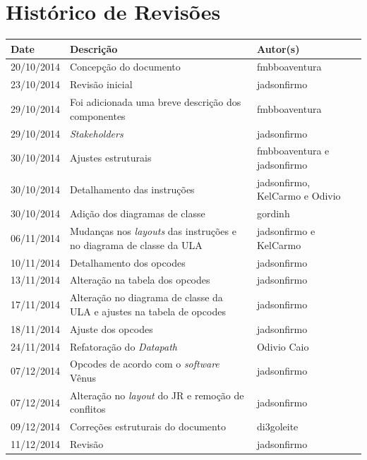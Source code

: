 \documentclass{report}
\begin{document}

\capa
\newpage
\newpage

\chapter*{Histórico de Revisões}
  \vspace*{1cm}
  \begin{table}[ht]
    \centering
    \begin{tabular}[pos]{|m{2cm} | m{8cm} | m{4cm}|} 
      \hline
      \cellcolor[gray]{0.9}
      \textbf{Date} & \cellcolor[gray]{0.9}\textbf{Descrição} & \cellcolor[gray]{0.9}\textbf{Autor(s)}\\
      \hline 20/10/2014 & Concepção do documento & fmbboaventura \\ \hline
      		 23/10/2014 & Revisão inicial & jadsonfirmo \\ \hline
      		 29/10/2014 & Foi adicionada uma breve descrição dos componentes & fmbboaventura \\ \hline       
      		 29/10/2014 & \textit{Stakeholders} & jadsonfirmo \\ \hline
      		 30/10/2014 & Ajustes estruturais & fmbboaventura e jadsonfirmo \\ \hline
      		 30/10/2014 & Detalhamento das instruções & jadsonfirmo, KelCarmo e Odivio \\ \hline
      		 30/10/2014 & Adição dos diagramas de classe & gordinh \\ \hline
      		 06/11/2014 & Mudanças nos \textit{layouts} das instruções e no diagrama de classe da ULA & jadsonfirmo e KelCarmo \\ \hline
      		 10/11/2014 & Detalhamento dos opcodes & jadsonfirmo \\ \hline
      		 13/11/2014 & Alteração na tabela dos opcodes & jadsonfirmo \\ \hline
      		 17/11/2014 & Alteração no diagrama de classe da ULA e ajustes na tabela de opcodes & jadsonfirmo \\ \hline
      		 18/11/2014 & Ajuste dos opcodes & jadsonfirmo \\ \hline
 		     24/11/2014 & Refatoração do \textit{Datapath} & Odivio Caio \\ \hline
		  	 07/12/2014 & Opcodes de acordo com o \textit{software} Vênus & jadsonfirmo \\ \hline
		  	 07/12/2014 & Alteração no \textit{layout} do JR e remoção de conflitos & jadsonfirmo \\ \hline
		  	 09/12/2014 & Correções estruturais do documento & di3goleite \\ \hline
		  	 11/12/2014 & Revisão & jadsonfirmo \\ \hline
    \end{tabular}
  \end{table}
\end{document}
